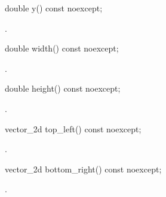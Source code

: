 \begin{itemdecl}
double y() const noexcept;
\end{itemdecl}
\begin{itemdescr}
	\pnum
	\returns
	.

\end{itemdescr}

\begin{itemdecl}
double width() const noexcept;
\end{itemdecl}
\begin{itemdescr}
	\pnum
	\returns
	.

\end{itemdescr}

\begin{itemdecl}
double height() const noexcept;
\end{itemdecl}
\begin{itemdescr}
	\pnum
	\returns
	.

\end{itemdescr}

\begin{itemdecl}
vector_2d top_left() const noexcept;
\end{itemdecl}
\begin{itemdescr}
	\pnum
	\returns
	.
	
\end{itemdescr}

\begin{itemdecl}
vector_2d bottom_right() const noexcept;
\end{itemdecl}
\begin{itemdescr}
	\pnum
	\returns
	.

\end{itemdescr}
